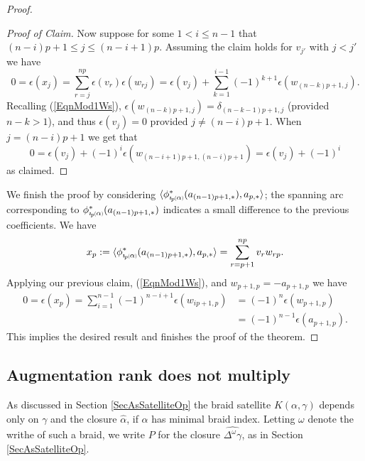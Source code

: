 \documentclass[11pt]{amsart}
\newcommand*{\subsmallp}[1]{\scalebox{.5}{\ensuremath#1}}
\newcommand{\subpp}[2][p]{\imath_{\hspace*{-1pt}#1}\hspace*{-.5pt}\subsmallp(#2\subsmallp)}
\theoremstyle{definition}
\begin{document}
\begin{proof}
\begin{proof}[Proof of Claim]
Now suppose for some $1<i\le n-1$ that $(n-i)p+1\le j \le (n-i+1)p$. Assuming the claim holds for $v_{j'}$ with $j<j'$ we have
      \[0 = \epsilon(x_j) = \sum_{r=j}^{np}\epsilon(v_r)\epsilon(w_{rj}) = \epsilon(v_j) + \sum_{k=1}^{i-1}(-1)^{k+1}\epsilon(w_{(n-k)p+1,j}).\]
Recalling (\ref{EqnMod1Ws}), $\epsilon(w_{(n-k)p+1,j})=\delta_{(n-k-1)p+1,j}$ (provided $n-k>1$), and thus $\epsilon(v_j) = 0$ provided $j\ne (n-i)p+1$. When $j=(n-i)p+1$ we get that 
      \[0 = \epsilon(v_j) + (-1)^{i}\epsilon(w_{(n-i+1)p+1,(n-i)p+1}) = \epsilon(v_j) + (-1)^{i}\]
\noindent as claimed.
\end{proof}

We finish the proof by considering $\langle \phi^{\ast}_{\subpp\alpha}(a_{(n-1)p+1,\ast}), a_{p,\ast} \rangle$; the spanning arc corresponding to $\phi^{\ast}_{\subpp\alpha}(a_{(n-1)p+1,\ast})$ indicates a small difference to the previous coefficients. We have
      \[x_p := \langle \phi^{\ast}_{\subpp\alpha}(a_{(n-1)p+1,\ast}), a_{p,\ast} \rangle = \sum_{r=p+1}^{np}v_rw_{rp}.\]
Applying our previous claim, (\ref{EqnMod1Ws}), and $w_{p+1,p}=-a_{p+1,p}$ we have
        \begin{align*}
        0 = \epsilon(x_p)   = \sum_{i=1}^{n-1}(-1)^{n-i+1}\epsilon(w_{ip+1,p})  &= (-1)^n\epsilon(w_{p+1,p})\\
                                                                                &= (-1)^{n-1}\epsilon(a_{p+1,p}).
        \end{align*}
This implies the desired result and finishes the proof of the theorem. 
\end{proof}

\subsection{Augmentation rank does not multiply}
\label{SecMultiplic}

As discussed in Section \ref{SecAsSatelliteOp} the braid satellite $K(\alpha,\gamma)$ depends only on $\gamma$ and the closure $\hat{\alpha}$, if $\alpha$ has minimal braid index. Letting $\omega$ denote the writhe of such a braid, we write $P$ for the closure $\widehat{\Delta^\omega\gamma}$, as in Section \ref{SecAsSatelliteOp}.
\end{document}
